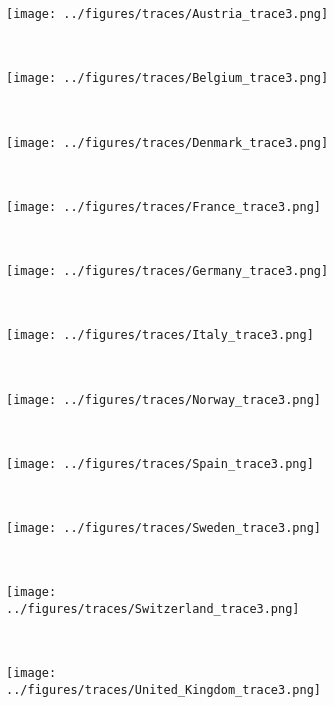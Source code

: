 \documentclass[12pt]{extarticle}
\begin{document}
\begin{figure}[p]	
    \centering
    \begin{subfigure}{0.32\textwidth}
        \texttt{[image: ../figures/traces/Austria\_trace3.png]}
    \end{subfigure}
    ~%
    \begin{subfigure}{0.32\textwidth}
        \texttt{[image: ../figures/traces/Belgium\_trace3.png]}
    \end{subfigure}
    ~%
    \begin{subfigure}{0.32\textwidth}
        \texttt{[image: ../figures/traces/Denmark\_trace3.png]}
    \end{subfigure}
	~%
    \begin{subfigure}{0.32\textwidth}
        \texttt{[image: ../figures/traces/France\_trace3.png]}
    \end{subfigure}
    ~%
    \begin{subfigure}{0.32\textwidth}
        \texttt{[image: ../figures/traces/Germany\_trace3.png]}
    \end{subfigure}
    ~%
    \begin{subfigure}{0.32\textwidth}
        \texttt{[image: ../figures/traces/Italy\_trace3.png]}
    \end{subfigure}
    ~%
	\begin{subfigure}{0.32\textwidth}
        \texttt{[image: ../figures/traces/Norway\_trace3.png]}
    \end{subfigure}
    ~%
	\begin{subfigure}{0.32\textwidth}
        \texttt{[image: ../figures/traces/Spain\_trace3.png]}
    \end{subfigure}
    ~%
	\begin{subfigure}{0.32\textwidth}
        \texttt{[image: ../figures/traces/Sweden\_trace3.png]}
    \end{subfigure}
    ~%
	\begin{subfigure}{0.32\textwidth}
        \texttt{[image: ../figures/traces/Switzerland\_trace3.png]}
    \end{subfigure}
    ~%
	\begin{subfigure}{0.32\textwidth}
        \texttt{[image: ../figures/traces/United\_Kingdom\_trace3.png]}
    \end{subfigure}

\end{figure}
\end{document}
